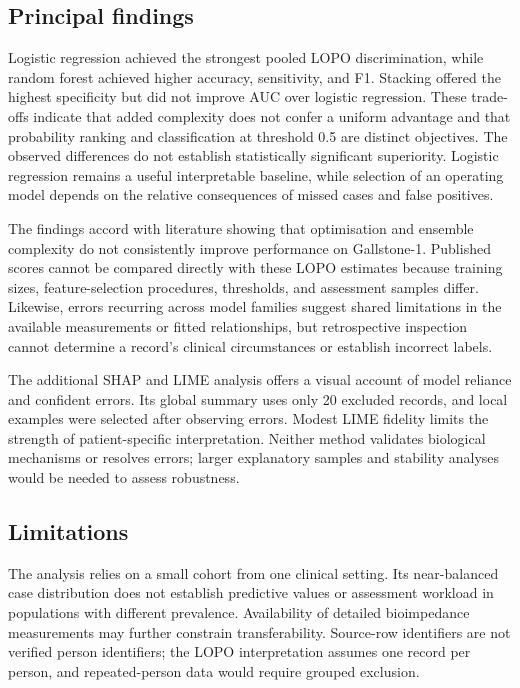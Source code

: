 \subsection{Principal findings}
Logistic regression achieved the strongest pooled LOPO discrimination, while random forest achieved higher accuracy, sensitivity, and F1. Stacking offered the highest specificity but did not improve AUC over logistic regression. These trade-offs indicate that added complexity does not confer a uniform advantage and that probability ranking and classification at threshold 0.5 are distinct objectives. The observed differences do not establish statistically significant superiority. Logistic regression remains a useful interpretable baseline, while selection of an operating model depends on the relative consequences of missed cases and false positives.

The findings accord with literature showing that optimisation and ensemble complexity do not consistently improve performance on Gallstone-1. Published scores cannot be compared directly with these LOPO estimates because training sizes, feature-selection procedures, thresholds, and assessment samples differ. Likewise, errors recurring across model families suggest shared limitations in the available measurements or fitted relationships, but retrospective inspection cannot determine a record's clinical circumstances or establish incorrect labels.

The additional SHAP and LIME analysis offers a visual account of model reliance and confident errors. Its global summary uses only 20 excluded records, and local examples were selected after observing errors. Modest LIME fidelity limits the strength of patient-specific interpretation. Neither method validates biological mechanisms or resolves errors; larger explanatory samples and stability analyses would be needed to assess robustness.

\subsection{Limitations}
The analysis relies on a small cohort from one clinical setting. Its near-balanced case distribution does not establish predictive values or assessment workload in populations with different prevalence. Availability of detailed bioimpedance measurements may further constrain transferability. Source-row identifiers are not verified person identifiers; the LOPO interpretation assumes one record per person, and repeated-person data would require grouped exclusion.

